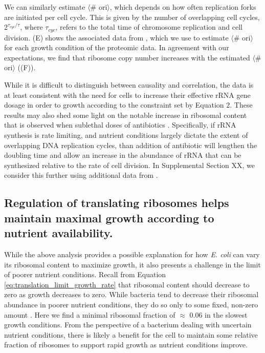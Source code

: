 We can similarly estimate $\langle$\# ori$\rangle$, which depends on how often
replication forks are initiated per cell cycle. This is given by the number of
overlapping cell cycles,  2$^{\tau_{cyc} / \tau}$, where $\tau_{cyc}$, refers to
the total time of chromosome replication and cell division.
(E) shows the associated data from \cite{si2019},
which we use to estimate $\langle$\# ori$\rangle$  for each growth condition of
the proteomic data. In agreement with our expectations, we find that ribosome
copy number increases with the estimated $\langle$\# ori$\rangle$
((F)).

While it is difficult to distinguish between causality and correlation, the data
is at least consistent with the need for cells to increase their effective rRNA
gene dosage in order to growth according to the constraint set by Equation 2.
These results may also shed some light on the notable increase in ribosomal
content that is observed when sublethal doses of antibiotics \citep{scott2010,
dai2016}. Specifically, if rRNA synthesis is rate limiting, and nutrient
conditions largely dictate the extent of overlapping DNA replication cycles,
than addition of antibiotic will lengthen the doubling time and allow an
increase in the abundance of rRNA that can be synthesized relative to the rate
of cell division. In Supplemental Section XX, we consider this further using
additional data from \cite{si2017}.

\subsection{Regulation of translating ribosomes helps maintain maximal growth
according to nutrient availability.}

While the above analysis provides a possible explanation for how \textit{E. coli}
can vary its ribosomal content to maximize growth, it also presents a
challenge in the limit of poorer nutrient conditions. Recall from Equation
\ref{eq:translation_limit_growth_rate} that ribosomal content should decrease to
zero as growth decreases to zero. While bacteria tend to decrease their
ribosomal abundance in poorer nutrient conditions, they do so only to some
fixed, non-zero amount \citep{scott2010, liebermeister2014}. Here we find a
minimal ribosomal fraction of $\approx$ 0.06 in the slowest growth conditions.
From the perspective of a bacterium dealing with uncertain nutrient conditions,
there is likely a benefit for the cell to maintain some relative fraction of
ribosomes to support rapid growth as nutrient conditions improve.

